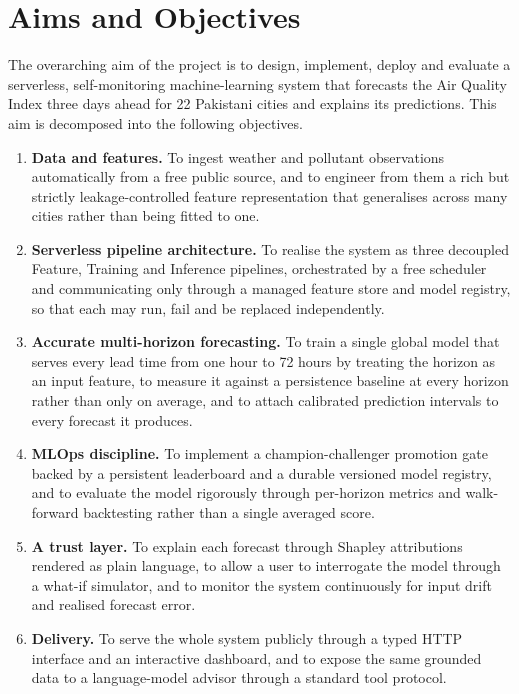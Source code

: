 \section{Aims and Objectives}
The overarching aim of the project is to design, implement, deploy and evaluate a
serverless, self-monitoring machine-learning system that forecasts the Air
Quality Index three days ahead for 22 Pakistani cities and explains its
predictions. This aim is decomposed into the following objectives.

\begin{enumerate}
  \item \textbf{Data and features.} To ingest weather and pollutant observations
  automatically from a free public source, and to engineer from them a rich but
  strictly leakage-controlled feature representation that generalises across many
  cities rather than being fitted to one.
  \item \textbf{Serverless pipeline architecture.} To realise the system as three
  decoupled Feature, Training and Inference pipelines, orchestrated by a free
  scheduler and communicating only through a managed feature store and model
  registry, so that each may run, fail and be replaced independently.
  \item \textbf{Accurate multi-horizon forecasting.} To train a single global
  model that serves every lead time from one hour to 72 hours by treating the
  horizon as an input feature, to measure it against a persistence baseline at
  every horizon rather than only on average, and to attach calibrated prediction
  intervals to every forecast it produces.
  \item \textbf{MLOps discipline.} To implement a champion-challenger promotion
  gate backed by a persistent leaderboard and a durable versioned model registry,
  and to evaluate the model rigorously through per-horizon metrics and
  walk-forward backtesting rather than a single averaged score.
  \item \textbf{A trust layer.} To explain each forecast through Shapley
  attributions rendered as plain language, to allow a user to interrogate the
  model through a what-if simulator, and to monitor the system continuously for
  input drift and realised forecast error.
  \item \textbf{Delivery.} To serve the whole system publicly through a typed
  HTTP interface and an interactive dashboard, and to expose the same grounded
  data to a language-model advisor through a standard tool protocol.
\end{enumerate}

